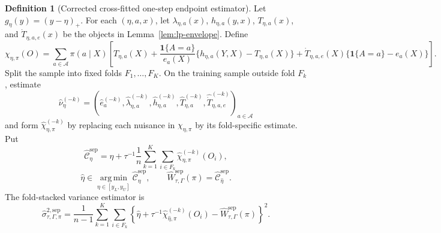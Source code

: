 \documentclass[11pt]{article}
\newcommand{\one}{\mathbf{1}}
\theoremstyle{definition}
\newtheorem{definition}{Definition}
\theoremstyle{plain}
\theoremstyle{remark}
\begin{document}
\begin{definition}[Corrected cross-fitted one-step endpoint estimator]\label{def:onestep}
Let \(g_\eta(y)=(y-\eta)_+\).  For each \((\eta,a,x)\), let
\(\lambda_{\eta,a}(x)\), \(h_{\eta,a}(y,x)\), \(T_{\eta,a}(x)\), and
\(\dot T_{\eta,a,e}(x)\) be the objects in Lemma~\ref{lem:lp-envelope}.  Define
\[
\chi_{\eta,\pi}(O)
=
\sum_{a\in\mathcal A}\pi(a\mid X)
\left[
T_{\eta,a}(X)
+
\frac{\one\{A=a\}}{e_a(X)}
\{h_{\eta,a}(Y,X)-T_{\eta,a}(X)\}
+
\dot T_{\eta,a,e}(X)\{\one\{A=a\}-e_a(X)\}
\right].
\]
Split the sample into fixed folds \(F_1,\ldots,F_K\).  On the training sample
outside fold \(F_k\), estimate
\[
\widehat\nu_\eta^{(-k)}
=
(\widehat e_a^{(-k)},\widehat\lambda_{\eta,a}^{(-k)},
 \widehat h_{\eta,a}^{(-k)},\widehat T_{\eta,a}^{(-k)},
 \widehat{\dot T}_{\eta,a,e}^{(-k)})_{a\in\mathcal A}
\]
and form \(\widehat\chi_{\eta,\pi}^{(-k)}\) by replacing each nuisance in
\(\chi_{\eta,\pi}\) by its fold-specific estimate.  Put
\[
\widehat{\mathcal C}_\eta^{\mathrm{sep}}
=
\eta+\tau^{-1}\frac1n
\sum_{k=1}^K\sum_{i\in F_k}
\widehat\chi_{\eta,\pi}^{(-k)}(O_i),
\]
\[
\widehat\eta
\in
\operatorname*{arg\,min}_{\eta\in[y_L,y_U]}
\widehat{\mathcal C}_\eta^{\mathrm{sep}},
\qquad
\widehat W_{\tau,\Gamma}^{\mathrm{sep}}(\pi)
=
\widehat{\mathcal C}_{\widehat\eta}^{\mathrm{sep}}.
\]
The fold-stacked variance estimator is
\[
\widehat\sigma_{\tau,\Gamma,\pi}^{2,\mathrm{sep}}
=
\frac1{n-1}\sum_{k=1}^K\sum_{i\in F_k}
\left\{
\widehat\eta+
\tau^{-1}\widehat\chi_{\widehat\eta,\pi}^{(-k)}(O_i)
-
\widehat W_{\tau,\Gamma}^{\mathrm{sep}}(\pi)
\right\}^2 .
\]
\end{definition}
\end{document}
